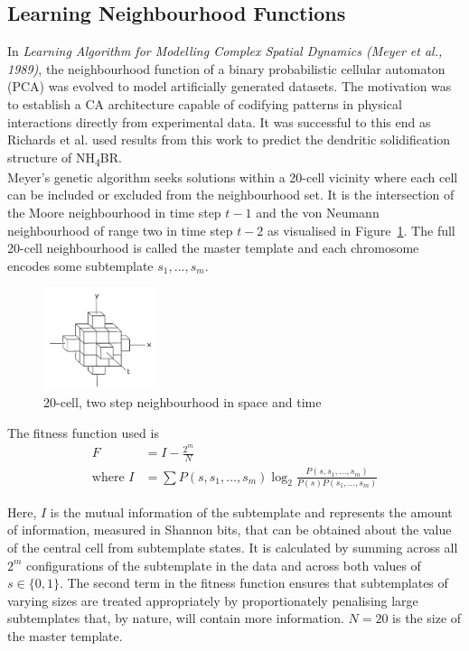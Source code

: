 \subsection{Learning Neighbourhood Functions}

In \textit{Learning Algorithm for Modelling Complex Spatial Dynamics (Meyer et al., 1989)}\cite{meyer1989learning}, the neighbourhood function of a binary probabilistic cellular automaton (PCA) was evolved to model artificially generated datasets. The motivation was to establish a CA architecture capable of codifying patterns in physical interactions directly from experimental data. It was successful to this end as Richards et al.\cite{richards1990extracting} used results from this work to predict the dendritic solidification structure of NH\textsubscript{4}BR.\\

Meyer's genetic algorithm seeks solutions within a 20-cell vicinity where each cell can be included or excluded from the neighbourhood set. It is the intersection of the Moore neighbourhood in time step $t-1$ and the von Neumann neighbourhood of range two in time step $t-2$ as visualised in Figure~\ref{fig:20-near}. The full 20-cell neighbourhood is called the master template and each chromosome encodes some subtemplate ${s_1, ..., s_m}$.\\

\begin{figure}[!h]
\centering
\includegraphics[width=0.3\textwidth]{images/20_neighbourhood.png}
\caption{20-cell, two step neighbourhood in space and time\cite{meyer1989learning}}
\label{fig:20-near}
\end{figure}

The fitness function used is
\begin{align}
                    F &= I - \frac{2^m}{N}\\
    \text{where\ }  I &= \sum P(s, s_1, ..., s_m)\log_2{\frac{P(s, s_1, ..., s_m)}{P(s)P(s_1, ..., s_m)}}
\end{align}

Here, $I$ is the mutual information of the subtemplate and represents the amount of information, measured in Shannon bits, that can be obtained about the value of the central cell from subtemplate states. It is calculated by summing across all $2^m$ configurations of the subtemplate in the data and across both values of $s \in \{0,1\}$. The second term in the fitness function ensures that subtemplates of varying sizes are treated appropriately by proportionately penalising large subtemplates that, by nature, will contain more information. $N=20$ is the size of the master template.\\


